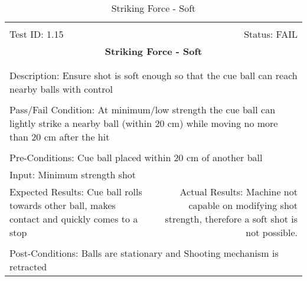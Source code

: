 \documentclass[titlepage]{article}
\begin{document}
\begin{center}
\begin{table}[h!]
\begin{tabular}{|l r|}\hline&\\[-2mm]
	Test ID: 1.15	&Status: FAIL\\[-3mm]
	\multicolumn{2}{|c|}{\textbf{\large{Striking Force - Soft}}}\\&\\\hline&\\[-3mm]
	\multicolumn{2}{|p{\textwidth}|}{Description: Ensure shot is soft enough so that the cue ball can reach nearby balls with control}\\[1mm]\hline&\\[-3mm]
	\multicolumn{2}{|p{\textwidth}|}{Pass/Fail Condition: At minimum/low strength the cue ball can lightly strike a nearby ball (within 20 cm) while moving no more than 20 cm after the hit}\\[1mm]\hline&\\[-3mm]
	\multicolumn{2}{|p{\textwidth}|}{Pre-Conditions: Cue ball placed within 20 cm of another ball}\\[4mm]
	\multicolumn{2}{|p{\textwidth}|}{Input: Minimum strength shot}\\[2mm]\hline
	\multicolumn{1}{|p{0.49\textwidth}}{Expected Results: Cue ball rolls towards other ball, makes contact and quickly comes to a stop}	&\multicolumn{1}{|p{0.45\textwidth}|}{Actual Results: Machine not capable on modifying shot strength, therefore a soft shot is not possible.}\\\hline&\\[-3mm]
	\multicolumn{2}{|p{\textwidth}|}{Post-Conditions: Balls are stationary and Shooting mechanism is retracted}\\\hline
\end{tabular}
\caption{Striking Force - Soft}
\end{table}
\end{center}
\end{document}
